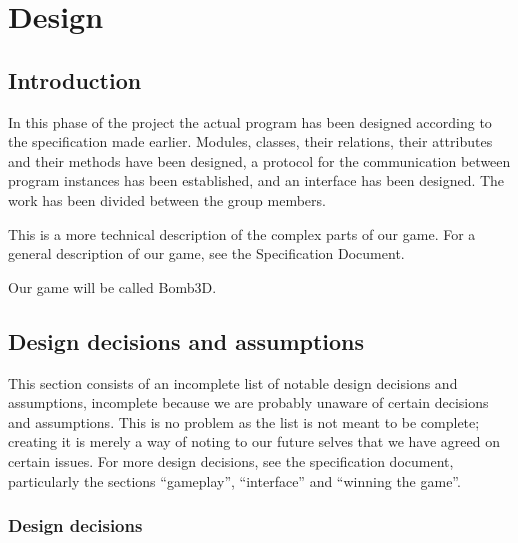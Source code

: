 \chapter{Design} %
\label{cha:design}

    \section{Introduction}

    In this phase of the project the actual program has been designed according to the specification made earlier. Modules, classes, their relations, their attributes and their methods have been designed, a protocol for the communication between program instances has been established, and an interface has been designed. The work has been divided between the group members.

    This is a more technical description of the complex parts of our game. For a general description of our game, see the Specification Document.

    Our game will be called Bomb3D.

    \newpage
    \section{Design decisions and assumptions}

    This section consists of an incomplete list of notable design decisions and assumptions, incomplete because we are probably unaware of certain decisions and assumptions. This is no problem as the list is not meant to be complete; creating it is merely a way of noting to our future selves that we have agreed on certain issues. For more design decisions, see the specification document, particularly the sections ``gameplay'', ``interface'' and ``winning the game''.

    \subsection{Design decisions}

